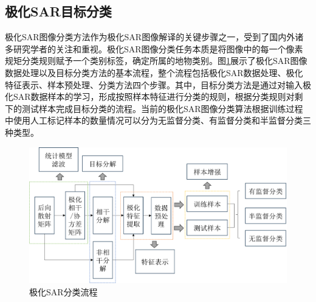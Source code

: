 \subsection{极化SAR目标分类}
极化SAR图像分类方法作为极化SAR图像解译的关键步骤之一，受到了国内外诸多研究学者的关注和重视。极化SAR图像分类任务本质是将图像中的每一个像素规矩分类规则赋予一个类别标签，确定所属的地物类别。图\ref{fig:极化SAR图像目标分类流程}展示了极化SAR图像数据处理以及目标分类方法的基本流程，整个流程包括极化SAR数据处理、极化特征表示、样本预处理、分类方法四个步骤。其中，目标分类方法是通过对输入极化SAR数据样本的学习，形成按照样本特征进行分类的规则，根据分类规则对剩下的测试样本完成目标分类的流程。当前的极化SAR图像分类算法根据训练过程中使用人工标记样本的数量情况可以分为无监督分类、有监督分类和半监督分类三种类型。

\begin{figure}[h]
    \includegraphics[width=12.3cm]{pic/chapter1/极化SAR分类流程.png}
    \caption{极化SAR分类流程}
    \label{fig:极化SAR图像目标分类流程}
\end{figure}


